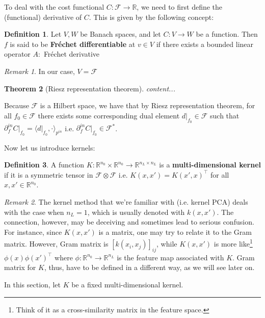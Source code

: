 \documentclass{article}
\theoremstyle{plain}
\newtheorem{theorem}{Theorem}
\theoremstyle{definition}
\newtheorem{definition}[theorem]{Definition}
\theoremstyle{remark}
\newtheorem{remark}{Remark}
\begin{document}
To deal with the cost functional $C : \mathcal{F} \rightarrow \mathbb{R}$, we need to first define the (functional) derivative of $C$.
This is given by the following concept:

\begin{definition}
	Let $V, W$ be Banach spaces, and let $C: V \rightarrow W$ be a function.
	Then $f$ is said to be {\bf Fr\'{e}chet differentiable} at $v \in V$ if there exists a bounded linear operator $A : $
	Fr\'{e}chet derivative
\end{definition}
\begin{remark}
	In our case, $V = \mathcal{F}$
\end{remark}

\begin{theorem}[Riesz representation theorem]
	content...
\end{theorem}

Because $\mathcal{F}$ is a Hilbert space, we have that by Riesz representation theorem, for all $f_0 \in \mathcal{F}$ there exists some corresponding dual element $d \rvert_{f_0} \in \mathcal{F}$ such that $\partial_f^{in} C \rvert_{f_0} = \langle d\rvert_{f_0}, \cdot \rangle_{p^{in}}$ i.e. $\partial_f^{in} C \rvert_{f_0} \in \mathcal{F}^*$.


Now let us introduce kernels:
\begin{definition}
	A function $K : \mathbb{R}^{n_0} \times \mathbb{R}^{n_0} \rightarrow \mathbb{R}^{n_L \times n_L}$ is a {\bf multi-dimensional kernel} if it is a symmetric tensor in $\mathcal{F} \otimes \mathcal{F}$ i.e. $K(x, x') = K(x', x)^\intercal$ for all $x, x' \in \mathbb{R}^{n_0}$.
\end{definition}
\begin{remark}
	The kernel method that we're familiar with (i.e. kernel PCA) deals with the case when $n_L = 1$, which is usually denoted with $k(x, x')$.
	The connection, however, may be deceiving and sometimes lead to serious confusion.
	For instance, since $K(x, x')$ is a matrix, one may try to relate it to the Gram matrix.
	However, Gram matrix is $[k(x_i, x_j)]_{ij}$, while $K(x, x')$ is more like\footnote{Think of it as a cross-similarity matrix in the feature space.} $\phi(x) \phi(x')^\intercal$ where $\phi : \mathbb{R}^{n_0} \rightarrow \mathbb{R}^{n_L}$ is the feature map associated with $K$.
	Gram matrix for $K$, thus, have to be defined in a different way, as we will see later on.
\end{remark}

In this section, let $K$ be a fixed multi-dimensional kernel.
\end{document}
